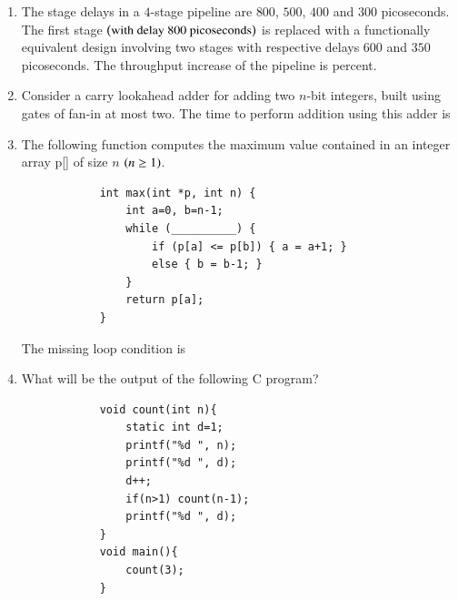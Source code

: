 \documentclass[journal,12pt,onecolumn]{IEEEtran}
\theoremstyle{remark}
\begin{document}
\begin{enumerate}
		\hfill{}
		
		\item The stage delays in a $4$-stage pipeline are $800$, $500$, $400$ and $300$ picoseconds. The first stage $\left(\text{with delay } 800 \text{ picoseconds}\right)$ is replaced with a functionally equivalent design involving two stages with respective delays $600$ and $350$ picoseconds. The throughput increase of the pipeline is \underline{\hspace{2cm}} percent.
		
		\hfill{}
		
		\item Consider a carry lookahead adder for adding two $n$-bit integers, built using gates of fan-in at most two. The time to perform addition using this adder is
		
		\hfill{}
		\begin{enumerate}
		\end{enumerate}
		
		\item The following function computes the maximum value contained in an integer array p[] of size $n$ $\left(n \geq 1\right)$.
		\begin{verbatim}
			int max(int *p, int n) {
				int a=0, b=n-1;
				while (__________) {
					if (p[a] <= p[b]) { a = a+1; }
					else { b = b-1; }
				}
				return p[a];
			}
		\end{verbatim}
		The missing loop condition is
		
		\hfill{\brak{\text{GATE CS 2016}}}
		\begin{enumerate}
			\begin{multicols}{4}
				\item a != n
				\item b != 0
				\item b $>$ $\brak{\text{a + 1}}$
				\item b != a
			\end{multicols}
		\end{enumerate}
		
		\item What will be the output of the following C program?
		\begin{verbatim}
			void count(int n){
				static int d=1;
				printf("%d ", n);
				printf("%d ", d);
				d++;
				if(n>1) count(n-1);
				printf("%d ", d);
			}
			void main(){
				count(3);
			}
		\end{verbatim}
		

\end{enumerate}
\end{document}
